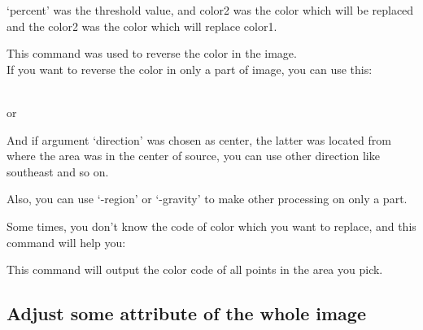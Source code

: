 \documentclass[12pt]{article}
\begin{document}
`percent' was the threshold value, and color2 was the color which will be replaced and the color2 was the color which will replace color1.\\

{\centering{}\par}\vspace{5mm}

This command was used to reverse the color in the image.\\

If you want to reverse the color in only a part of image, you can use this:\\

{\centering{}\\ \vspace{5mm}
or\\ \vspace{5mm}
\par}\vspace{5mm}

And if argument `direction' was chosen as center, the latter was located from where the area was in the center of source, you can use other direction like southeast and so on.

Also, you can use `-region' or `-gravity' to make other processing on only a part.

Some times, you don't know the code of color which you want to replace, and this command will help you:\vspace{5mm}

{\centering{}\par}\vspace{5mm}

This command will output the color code of all points in the area you pick.\vspace{5mm}

\subsection{Adjust some attribute of the whole image}

{\centering{}\par}\vspace{5mm}
\end{document}
